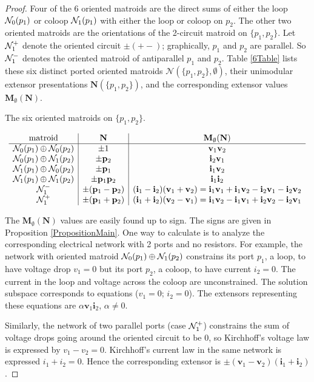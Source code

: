 \documentclass[12pt]{article}
\theoremstyle{definition}
\newcommand{\ext}[1]{\ensuremath{\mathbf{#1}}}
\begin{document}
\begin{proof}
Four of the 6 oriented matroids are the direct sums
of either the loop $\mathcal{N}_0(p_1)$ or coloop $\mathcal{N}_1(p_1)$ 
with either the loop or coloop on $p_2$.   
The other two oriented matroids are the orientations
of the 2-circuit matroid on $\{p_1,p_2\}$.
Let $\mathcal{N}_1^+$ denote the oriented circuit
$\pm(+-)$; graphically, $p_1$ and $p_2$ are parallel.
So $\mathcal{N}_1^-$ denotes the oriented matroid of antiparallel
$p_1$ and $p_2$.
Table \ref{6Table} lists 
these six distinct 
ported oriented matroids $\mathcal{N}(\{p_1,p_2\},\emptyset)$,
their unimodular extensor presentations $\ext{N}(\{p_1,p_2\})$,
and the corresponding extensor values $\ext{M}_{\emptyset}(\ext{N})$.
\begin{table}[!ht]
\caption{\label{6Table}The six oriented matroids on $\{p_1,p_2\}$.}
\[
\begin{array}{c|c|c}
\mathrm{matroid} & \ext{N} & \ext{M}_\emptyset(\ext{N}) \\ \hline
\omN_0(p_1)\oplus \omN_0(p_2) &\pm 1& \ext{v}_1\ext{v}_2 \\
\omN_0(p_1)\oplus \omN_1(p_2) &\pm \ext{p}_2& \ext{i}_2\ext{v}_1 \\
\omN_1(p_1)\oplus \omN_0(p_2) &\pm \ext{p}_1& \ext{i}_1\ext{v}_2 \\
\omN_1(p_1)\oplus \omN_1(p_2) &\pm \ext{p}_1\ext{p}_2& \ext{i}_1\ext{i}_2 \\
\omN_1^- &\pm(\ext{p}_1-\ext{p}_2)& (\ext{i}_1-\ext{i}_2)(\ext{v}_1+\ext{v}_2)=
    \ext{i}_1\ext{v}_1+\ext{i}_1\ext{v}_2-\ext{i}_2\ext{v}_1-\ext{i}_2\ext{v}_2 \\
\omN_1^+ &\pm(\ext{p}_1+\ext{p}_2)& (\ext{i}_1+\ext{i}_2)(\ext{v}_2-\ext{v}_1)=
     \ext{i}_1\ext{v}_2-\ext{i}_1\ext{v}_1+\ext{i}_2\ext{v}_2-\ext{i}_2\ext{v}_1
\end{array}
\]
\end{table}
The $\ext{M}_{\emptyset}(\ext{N})$ 
values are easily found up to sign.  The signs are given in
Proposition \ref{PropositionMain}.  
One way to calculate is to analyze 
the corresponding electrical network with
2 ports and no resistors.
For example, the network with
oriented matroid $\mathcal{N}_0(p_1)\oplus \mathcal{N}_1(p_2)$ 
constrains its port $p_1$, a loop, to
have  voltage drop $v_1=0$ but its port $p_2$, a coloop, to have current
$i_2=0$.
The current in the loop and voltage across the coloop are unconstrained.
The solution subspace 
corresponds to equations 
($v_1=0$; $i_2=0$).
The extensors representing these equations
are 
$\alpha \ext{v}_1\ext{i}_2$, $\alpha\neq 0$.

Similarly, the network of two parallel ports (case $\mathcal{N}_1^+$)
constrains the sum of
voltage drops going around the oriented circuit to be $0$, so Kirchhoff's
voltage law is expressed by $v_1-v_2=0$.  Kirchhoff's current law
in the same network is expressed $i_1+i_2=0$.  Hence the corresponding
extensor is $\pm(\ext{v}_1-\ext{v}_2)(\ext{i}_1+\ext{i}_2)$.


\end{proof}
\end{document}
